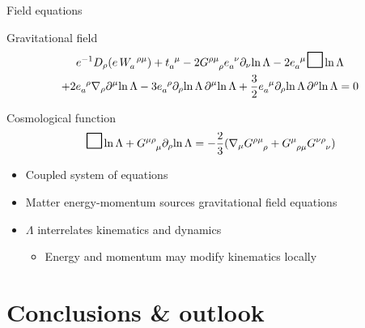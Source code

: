 \documentclass[t,hyperref={bookmarks=false}]{beamer}
\newcommand{\ind}{\indices}
\newcommand{\pd}{\partial}
\newcommand{\bitem}{\begin{itemize}}
\newcommand{\eitem}{\end{itemize}}
\newcommand{\dal}{\raisebox{-1.73pt}{%
    \scaleobj{2.07}{\square}\hspace{-0.1111em}}}
\begin{document}
\begin{frame}{Field equations}

\begin{block}{Gravitational field}
\vspace{-\baselineskip}
\begin{multline*}
  e^{-1} D_\rho (e\, W\ind{_a^{\rho\mu}}) + t\ind{_a^\mu} 
  - 2 G\ind{^{\rho\mu}_\rho} e\ind{_a^\nu} \pd_\nu\! \ln \Lambda 
  - 2 e\ind{_a^\mu} \dal \ln \Lambda
   \\
   +2 e\ind{_a^\rho} \nabla_\rho \pd^\mu\! \ln \Lambda 
   - 3 e\ind{_a^\rho} \pd_\rho\! \ln \Lambda\, \pd^\mu\! \ln 
   \Lambda + \frac{3}{2} e\ind{_a^\mu} \pd_\rho\! \ln \Lambda\, 
   \pd^\rho\! \ln \Lambda = 0
\end{multline*}
\end{block}

\begin{block}{Cosmological function}
\begin{equation*}
  \dal \ln \Lambda + G\ind{^{\mu\rho}_\mu} \pd_\rho\! \ln \Lambda 
  = -\frac{2}{3} ( \nabla_\mu G\ind{^{\rho\mu}_\rho} 
  + G\ind{^\mu_{\rho\mu}} G\ind{^{\nu\rho}_\nu} )
\end{equation*}
\end{block}

\bitem
\item Coupled system of equations
\item<2-> Matter energy-momentum sources gravitational field 
  equations
\item<3-> $\Lambda$ interrelates kinematics and dynamics
  \bitem
  \item Energy and momentum may modify kinematics locally
  \eitem
\eitem

\end{frame}

\section{Conclusions \& outlook}
\end{document}
